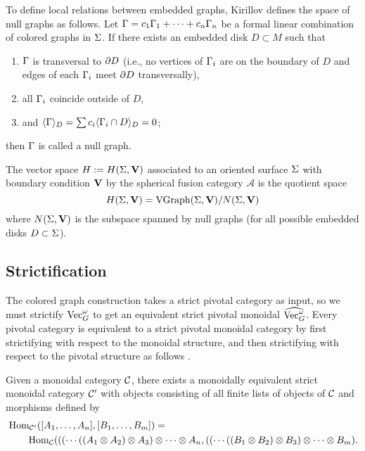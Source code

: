 To define local relations between embedded graphs, Kirillov defines the space of null graphs as follows. Let
$\Gamma=c_1\Gamma_1+\dots+c_n\Gamma_n$ be a formal linear
combination of colored graphs in $\Sigma$.  If there exists an embedded disk $D \subset M$ such that
\begin{enumerate}
  \item $\Gamma$ is transversal to $\partial D$ (i.e., no vertices of $\Gamma_i$ 
      are on the boundary of $D$ and edges of each $\Gamma_i$ meet 
      $\partial D$ transversally),
  \item all $\Gamma_i$ coincide outside of $D$,
  \item and $\langle\Gamma\rangle_D=\sum c_i\langle\Gamma_i\cap D\rangle_D=0$;
\end{enumerate}
then $\Gamma$ is called a null graph. 




\begin{defn}
The vector space $H := H(\Sigma, \mathbf{V})$ associated to an oriented surface $\Sigma$ with boundary condition $\mathbf{V}$ by the spherical fusion category $\mathcal A$ is the quotient space
 $$
   H(\Sigma, \mathbf{V})=\operatorname{VGraph}(\Sigma, \mathbf{V})/N(\Sigma, \mathbf{V})
  $$
  where $N(\Sigma, \mathbf{V})$ is  the subspace spanned by null graphs 
  (for all possible embedded disks  $D \subset \Sigma$). 
\end{defn}






\subsection{Strictification}
The colored graph construction takes a strict pivotal category as input, so we must strictify $\operatorname{Vec}_G^\omega$ to get an equivalent strict pivotal monoidal $\widehat {\operatorname{Vec}_G^\omega}$. Every pivotal category is equivalent to a strict pivotal monoidal category by first strictifying with respect to the monoidal structure, and then strictifying with respect to the pivotal structure as follows \cite{ns}.

Given a monoidal category $\mathcal{C}$, there exists a monoidally equivalent strict monoidal category $\mathcal{C}'$ with objects consisting of all finite lists of objects of $\mathcal{C}$ and morphisms defined by
\begin{align*}
& \operatorname{Hom}_{\mathcal{C}'}([A_1, \ldots, A_n], [B_1, \ldots, B_m]) = \\
& \qquad \operatorname{Hom}_{\mathcal{C}}(((\cdots((A_1 \otimes A_2) \otimes A_3) \otimes \cdots \otimes A_n, ((\cdots((B_1 \otimes B_2) \otimes B_3) \otimes \cdots \otimes B_m).
\end{align*}

